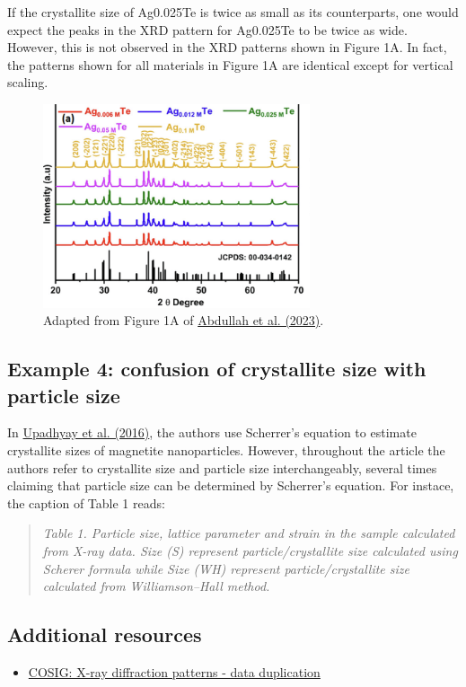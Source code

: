 \documentclass[letterpaper, 12pt]{article}
\begin{document}
If the crystallite size of Ag0.025Te is twice as small as its counterparts, one would expect the peaks in the XRD pattern for Ag0.025Te to be twice as wide. However, this is not observed in the XRD patterns shown in Figure 1A. In fact, the patterns shown for all materials in Figure 1A are identical except for vertical scaling.

\begin{figure}[h!tbp]
\centering
    \includegraphics[width=0.7\textwidth]{img/xrd/xrd_spectra_abdullah.png}
    \caption*{ Adapted from Figure 1A of \href{https://doi.org/10.1021/acs.energyfuels.2c03279}{Abdullah et al. (2023)}.}
\end{figure}

\subsection*{Example 4: confusion of crystallite size with particle size}

In \href{https://doi.org/10.1016/j.jallcom.2016.03.279}{Upadhyay et al. (2016)}, the authors use Scherrer's equation to estimate crystallite sizes of magnetite nanoparticles. However, throughout the article the authors refer to crystallite size and particle size interchangeably, several times claiming that particle size can be determined by Scherrer's equation. For instace, the caption of Table 1 reads:

\begin{quote}
    \textit{Table 1. Particle size, lattice parameter and strain in the sample calculated from X-ray data. Size (S) represent particle/crystallite size calculated using Scherer formula while Size (WH) represent particle/crystallite size calculated from Williamson–Hall method.}
\end{quote}

\subsection*{Additional resources}

\begin{itemize}
    \setlength\itemsep{-0.5em}
    \item \href{https://osf.io/685xa}{COSIG: X-ray diffraction patterns - data duplication}
\end{itemize}
\end{document}
